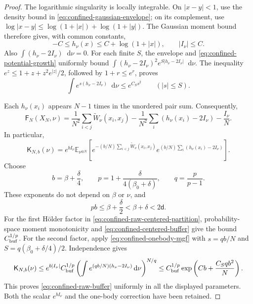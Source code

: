 \documentclass[11pt,reqno]{amsart}
\numberwithin{equation}{section}
\theoremstyle{definition}
\theoremstyle{remark}
\newcommand{\E}{\mathbb E}
\renewcommand{\d}{\mathsf d}
\newcommand{\Fr}{\mathsf F}
\newcommand{\K}{\mathsf K}
\newcommand{\dd}{\mathop{}\!\mathrm d}
\begin{document}
\begin{proof}
The logarithmic singularity is locally integrable. On $|x-y|<1$, use the density bound in \eqref{eq:confined-gaussian-envelope}; on its complement, use
$\log|x-y|\leq\log(1+|x|)+\log(1+|y|)$.
The Gaussian moment bound therefore gives, with common constants,
\begin{equation}\label{eq:confined-potential-growth}
 -C\leq h_\nu(x)\leq C+\log(1+|x|),\qquad |I_\nu|\leq C.
\end{equation}
Also $\int(h_\nu-2I_\nu)\dd\nu=0$. For each finite $S$, the envelope and \eqref{eq:confined-potential-growth} uniformly bound
$\int(h_\nu-2I_\nu)^2e^{S|h_\nu-2I_\nu|}\dd\nu$.
The inequality $e^z\leq1+z+z^2e^{|z|}/2$, followed by $1+r\leq e^r$, proves
\begin{equation}\label{eq:confined-onebody-mgf}
 \int e^{s(h_\nu-2I_\nu)}\dd\nu\leq e^{C_Ss^2}
 \qquad (|s|\leq S).
\end{equation}

Each $h_\nu(x_i)$ appears $N-1$ times in the unordered pair sum. Consequently,
\begin{equation}\label{eq:confined-raw-centered-splitting}
 \Fr_N(X_N,\nu)=\frac1{N^2}\sum_{i<j}\widetilde W_\nu(x_i,x_j)
 -\frac1{N^2}\sum_i(h_\nu(x_i)-2I_\nu)-\frac{I_\nu}{N}.
\end{equation}
In particular,
\begin{equation}\label{eq:confined-raw-centered-partition}
 \K_{N,b}(\nu)=e^{bI_\nu}\E_{\nu^{\otimes N}}\left[
 e^{-(b/N)\sum_{i<j}\widetilde W_\nu(x_i,x_j)}
 e^{(b/N)\sum_i(h_\nu(x_i)-2I_\nu)}\right].
\end{equation}
Choose
\begin{equation}\label{eq:confined-holder-parameters}
 b=\beta+\frac\delta4,\qquad
 p=1+\frac{\delta}{4(\beta_0+\delta)},\qquad q=\frac p{p-1}.
\end{equation}
These exponents do not depend on $\beta$ or $\nu$, and
\begin{equation}\label{eq:confined-holder-margin}
 pb\leq\beta+\frac\delta2<\beta+\delta<2\d.
\end{equation}
For the first H\"older factor in \eqref{eq:confined-raw-centered-partition}, probability-space moment monotonicity and \eqref{eq:confined-centered-buffer} give the bound $C_{\rm buf}^{1/p}$. For the second factor, apply \eqref{eq:confined-onebody-mgf} with $s=qb/N$ and $S=q(\beta_0+\delta/4)/2$. Independence gives
\begin{equation}\label{eq:confined-holder-estimate}
 \K_{N,b}(\nu)
 \leq e^{b|I_\nu|}C_{\rm buf}^{1/p}
       \left(\int e^{(qb/N)(h_\nu-2I_\nu)}\dd\nu\right)^{N/q}
 \leq C_{\rm buf}^{1/p}\exp\left(Cb+\frac{C_Sqb^2}{N}\right).
\end{equation}
This proves \eqref{eq:confined-raw-buffer} uniformly in all the displayed parameters. Both the scalar $e^{bI_\nu}$ and the one-body correction have been retained.


\end{proof}
\end{document}
